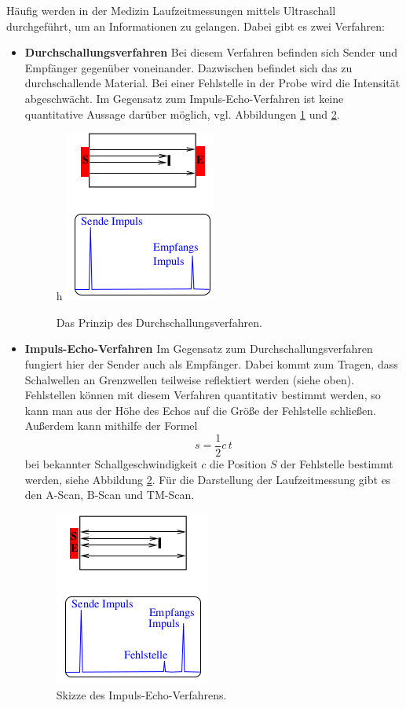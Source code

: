 Häufig werden in der Medizin Laufzeitmessungen mittels Ultraschall durchgeführt,
um an Informationen zu gelangen. Dabei gibt es zwei Verfahren:
\begin{itemize}
  \item \textbf{Durchschallungsverfahren}
  Bei diesem Verfahren befinden sich Sender und Empfänger gegenüber voneinander.
  Dazwischen befindet sich das zu durchschallende Material. Bei einer Fehlstelle
  in der Probe wird die Intensität abgeschwächt. Im Gegensatz zum Impuls-Echo-Verfahren
  ist keine quantitative Aussage darüber möglich, vgl. Abbildungen \ref{fig:1} und \ref{fig:2}.
  \begin{figure}{h}
    \centering
    \includegraphics[scale=0.5]{durchschall.png}
    \caption{Das Prinzip des Durchschallungsverfahren.}
    \label{fig:1}
  \end{figure}

  \item \textbf{Impuls-Echo-Verfahren}
  Im Gegensatz zum Durchschallungsverfahren fungiert hier der Sender auch als Empfänger.
  Dabei kommt zum Tragen, dass Schalwellen an Grenzwellen teilweise reflektiert werden (siehe oben).
  Fehlstellen können mit diesem Verfahren quantitativ bestimmt werden, so kann man aus der
  Höhe des Echos auf die Größe der Fehlstelle schließen. Außerdem kann mithilfe der Formel
  \begin{equation}
    s = \frac{1}{2} c \, t
    \label{eqn:6}
  \end{equation}
  bei bekannter Schallgeschwindigkeit $c$ die Position $S$ der Fehlstelle bestimmt werden, siehe Abbildung \ref{fig:2}.
  Für die Darstellung der Laufzeitmessung gibt es den A-Scan, B-Scan und TM-Scan.
  \begin{figure}
    \centering
    \includegraphics[scale=0.5]{impuls.png}
    \caption{Skizze des Impuls-Echo-Verfahrens.}
    \label{fig:2}
  \end{figure}
\end{itemize}
